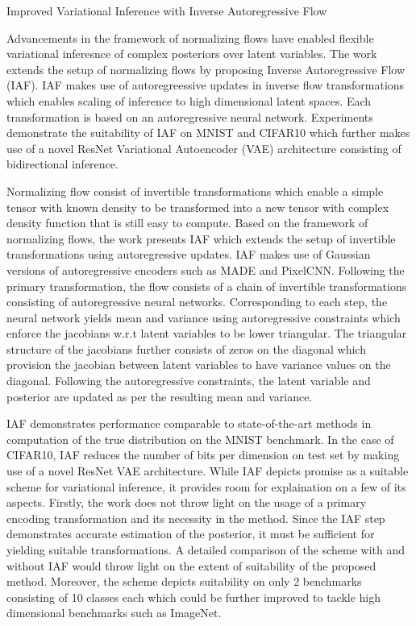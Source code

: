 \documentclass[11pt,letterpaper]{article}
\begin{document}
\begin{center}
  \large{Improved Variational Inference with Inverse Autoregressive Flow}
\end{center}
Advancements in the framework of normalizing flows have enabled flexible variational inferesnce of complex posteriors over latent variables. The work extends the setup of normalizing flows by proposing Inverse Autoregressive Flow (IAF). IAF makes use of autoregreessive updates in inverse flow transformations which enables scaling of inference to high dimensional latent spaces. Each transformation is based on an autoregressive neural network. Experiments demonstrate the suitability of IAF on MNIST and CIFAR10 which further makes use of a novel ResNet Variational Autoencoder (VAE) architecture consisting of bidirectional inference. 

Normalizing flow consist of invertible transformations which enable a simple tensor with known density to be transformed into a new tensor with complex density function that is still easy to compute. Based on the framework of normalizing flows, the work presents IAF which extends the setup of invertible transformations using autoregressive updates. IAF makes use of Gaussian versions of autoregressive encoders such as MADE and PixelCNN. Following the primary transformation, the flow consists of a chain of invertible transformations consisting of autoregressive neural networks. Corresponding to each step, the neural network yields mean and variance using autoregressive constraints which enforce the jacobians w.r.t latent variables to be lower triangular. The triangular structure of the jacobians further consists of zeros on the diagonal which provision the jacobian between latent variables to have variance values on the diagonal. Following the autoregressive constraints, the latent variable and posterior are updated as per the resulting mean and variance. 

IAF demonstrates performance comparable to state-of-the-art methods in computation of the true distribution on the MNIST benchmark. In the case of CIFAR10, IAF reduces the number of bits per dimension on test set by making use of a novel ResNet VAE architecture. While IAF depicts promise as a suitable scheme for variational inference, it provides room for explaination on a few of its aspects. Firstly, the work does not throw light on the usage of a primary encoding transformation and its necessity in the method. Since the IAF step demonstrates accurate estimation of the posterior, it must be sufficient for yielding suitable transformations. A detailed comparison of the scheme with and without IAF would throw light on the extent of suitability of the proposed method. Moreover, the scheme depicts suitability on only 2 benchmarks consisting of 10 classes each which could be further improved to tackle high dimensional benchmarks such as ImageNet.
\end{document}
